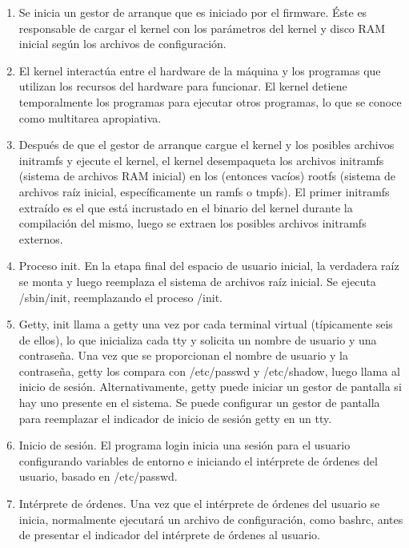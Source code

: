 \documentclass[a4paper]{article} %
\begin{document}
\begin{enumerate}
\item Se inicia un gestor de arranque que es iniciado por el firmware. Éste es responsable de cargar el kernel con los parámetros del kernel y disco RAM inicial según los archivos de configuración.
\item El kernel interactúa entre el hardware de la máquina y los programas que utilizan los recursos del hardware para funcionar. El kernel detiene temporalmente los programas para ejecutar otros programas, lo que se conoce como multitarea apropiativa.
\item Después de que el gestor de arranque cargue el kernel y los posibles archivos initramfs y ejecute el kernel, el kernel desempaqueta los archivos initramfs (sistema de archivos RAM inicial) en los (entonces vacíos) rootfs (sistema de archivos raíz inicial, específicamente un ramfs o tmpfs). El primer initramfs extraído es el que está incrustado en el binario del kernel durante la compilación del mismo, luego se extraen los posibles archivos initramfs externos. 
\item Proceso init. En la etapa final del espacio de usuario inicial, la verdadera raíz se monta y luego reemplaza el sistema de archivos raíz inicial. Se ejecuta /sbin/init, reemplazando el proceso /init. 
\item Getty, init llama a getty una vez por cada terminal virtual (típicamente seis de ellos), lo que inicializa cada tty y solicita un nombre de usuario y una contraseña. Una vez que se proporcionan el nombre de usuario y la contraseña, getty los compara con /etc/passwd y /etc/shadow, luego llama al inicio de sesión. Alternativamente, getty puede iniciar un gestor de pantalla si hay uno presente en el sistema. Se puede configurar un gestor de pantalla para reemplazar el indicador de inicio de sesión getty en un tty.
\item Inicio de sesión. El programa login inicia una sesión para el usuario configurando variables de entorno e iniciando el intérprete de órdenes del usuario, basado en /etc/passwd.
\item Intérprete de órdenes. Una vez que el intérprete de órdenes del usuario se inicia, normalmente ejecutará un archivo de configuración, como bashrc, antes de presentar el indicador del intérprete de órdenes al usuario.

\end{enumerate}
\cite{nombreSitioWeb}

\vfill
\end{document}
